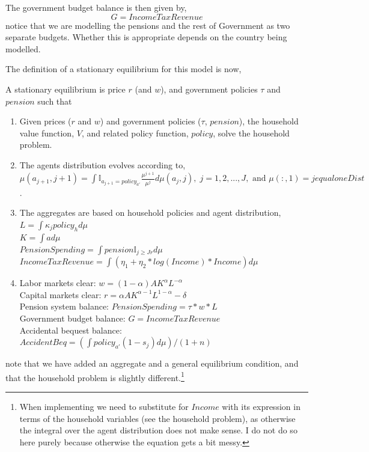 The government budget balance is then given by,
\begin{equation*}
 G=IncomeTaxRevenue
\end{equation*}
notice that we are modelling the pensions and the rest of Government as two separate budgets. Whether this is appropriate depends on the country being modelled.

The definition of a stationary equilibrium for this model is now,
\begin{definition}
 A stationary equilibrium is price $r$ (and $w$), and government policies $\tau$ and $pension$ such that
 \begin{enumerate}
  \item Given prices ($r$ and $w$) and government policies ($\tau$, $pension$), the household value function, $V$, and related policy function, $policy$, solve the household problem.
  \item The agents distribution evolves according to,
   \\  $\mu(a_{j+1},j+1)=\int \mathbb{I}_{a_{j+1}=policy_{a'}} \frac{\mu^{j+1}}{\mu^j} d\mu(a_j,j), \; j=1,2,...,J,\text{ and } \mu(:,1)=jequaloneDist$.
  \item The aggregates are based on household policies and agent distribution,
   \\ $L=\int \kappa_j policy_h d\mu$
   \\ $K=\int a d\mu$
   \\ $PensionSpending=\int pension \mathbb{I}_{j\geq Jr} d\mu$
   \\ $IncomeTaxRevenue=\int (\eta_1+\eta_2*log(Income)*Income) d\mu$
  \item Labor markets clear: $w=(1-\alpha)A K^{\alpha}L^{-\alpha}$
   \\ Capital markets clear: $r=\alpha A K^{\alpha-1} L^{1-\alpha} - \delta$
   \\ Pension system balance: $PensionSpending=\tau*w*L$
   \\ Government budget balance: $G=IncomeTaxRevenue$
   \\ Accidental bequest balance: $AccidentBeq=(\int policy_{a'}(1-s_j) d\mu)/(1+n)$
 \end{enumerate}
\end{definition}
\noindent note that we have added an aggregate and a general equilibrium condition, and that the household problem is slightly different.\footnote{When implementing we need to substitute for $Income$ with its expression in terms of the household variables (see the household problem), as otherwise the integral over the agent distribution does not make sense. I do not do so here purely because otherwise the equation gets a bit messy.}

